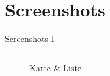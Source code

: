 \documentclass{beamer}
\begin{document}
	\section{Screenshots}
	\begin{frame}{Screenshots I}
		\begin{columns}[onlytextwidth]
			
			\begin{column}{0.5\textwidth}
				\centering
				\begin{figure}
					\caption{Karte \& Liste}
				\end{figure}
			\end{column}
			

\end{columns}
\end{frame}
\end{document}
